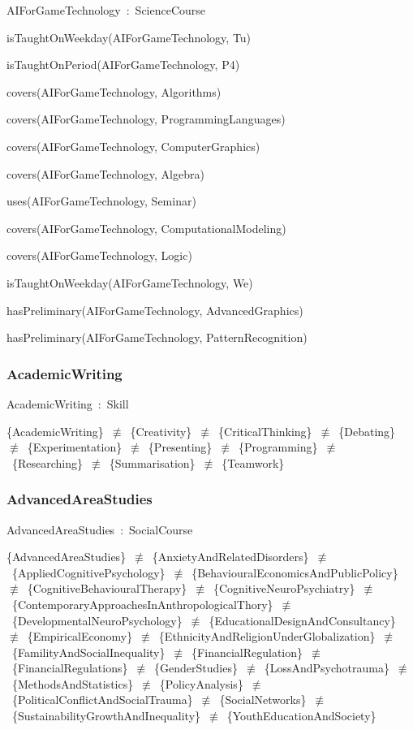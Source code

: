 \documentclass{article}
\begin{document}
AIForGameTechnology~:~ScienceCourse

isTaughtOnWeekday(AIForGameTechnology, Tu)

isTaughtOnPeriod(AIForGameTechnology, P4)

covers(AIForGameTechnology, Algorithms)

covers(AIForGameTechnology, ProgrammingLanguages)

covers(AIForGameTechnology, ComputerGraphics)

covers(AIForGameTechnology, Algebra)

uses(AIForGameTechnology, Seminar)

covers(AIForGameTechnology, ComputationalModeling)

covers(AIForGameTechnology, Logic)

isTaughtOnWeekday(AIForGameTechnology, We)

hasPreliminary(AIForGameTechnology, AdvancedGraphics)

hasPreliminary(AIForGameTechnology, PatternRecognition)

\subsubsection*{AcademicWriting}

AcademicWriting~:~Skill

\{AcademicWriting\}~\ensuremath{\not\equiv}~\{Creativity\}~\ensuremath{\not\equiv}~\{CriticalThinking\}~\ensuremath{\not\equiv}~\{Debating\}~\ensuremath{\not\equiv}~\{Experimentation\}~\ensuremath{\not\equiv}~\{Presenting\}~\ensuremath{\not\equiv}~\{Programming\}~\ensuremath{\not\equiv}~\{Researching\}~\ensuremath{\not\equiv}~\{Summarisation\}~\ensuremath{\not\equiv}~\{Teamwork\}

\subsubsection*{AdvancedAreaStudies}

AdvancedAreaStudies~:~SocialCourse

\{AdvancedAreaStudies\}~\ensuremath{\not\equiv}~\{AnxietyAndRelatedDisorders\}~\ensuremath{\not\equiv}~\{AppliedCognitivePsychology\}~\ensuremath{\not\equiv}~\{BehaviouralEconomicsAndPublicPolicy\}~\ensuremath{\not\equiv}~\{CognitiveBehaviouralTherapy\}~\ensuremath{\not\equiv}~\{CognitiveNeuroPsychiatry\}~\ensuremath{\not\equiv}~\{ContemporaryApproachesInAnthropologicalThory\}~\ensuremath{\not\equiv}~\{DevelopmentalNeuroPsychology\}~\ensuremath{\not\equiv}~\{EducationalDesignAndConsultancy\}~\ensuremath{\not\equiv}~\{EmpiricalEconomy\}~\ensuremath{\not\equiv}~\{EthnicityAndReligionUnderGlobalization\}~\ensuremath{\not\equiv}~\{FamilityAndSocialInequality\}~\ensuremath{\not\equiv}~\{FinancialRegulation\}~\ensuremath{\not\equiv}~\{FinancialRegulations\}~\ensuremath{\not\equiv}~\{GenderStudies\}~\ensuremath{\not\equiv}~\{LossAndPsychotrauma\}~\ensuremath{\not\equiv}~\{MethodsAndStatistics\}~\ensuremath{\not\equiv}~\{PolicyAnalysis\}~\ensuremath{\not\equiv}~\{PoliticalConflictAndSocialTrauma\}~\ensuremath{\not\equiv}~\{SocialNetworks\}~\ensuremath{\not\equiv}~\{SustainabilityGrowthAndInequality\}~\ensuremath{\not\equiv}~\{YouthEducationAndSociety\}
\end{document}

